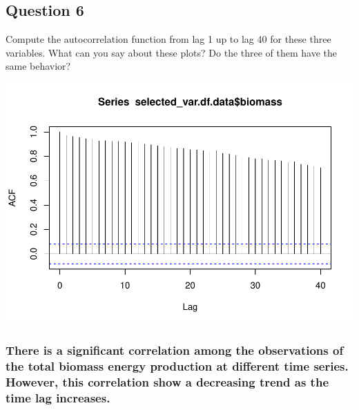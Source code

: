 \documentclass[
]{article}
\newenvironment{Shaded}{\begin{snugshade}}{\end{snugshade}}
\newcommand{\AttributeTok}[1]{\textcolor[rgb]{0.77,0.63,0.00}{#1}}
\newcommand{\ConstantTok}[1]{\textcolor[rgb]{0.00,0.00,0.00}{#1}}
\newcommand{\DecValTok}[1]{\textcolor[rgb]{0.00,0.00,0.81}{#1}}
\newcommand{\FunctionTok}[1]{\textcolor[rgb]{0.00,0.00,0.00}{#1}}
\newcommand{\NormalTok}[1]{#1}
\newcommand{\OtherTok}[1]{\textcolor[rgb]{0.56,0.35,0.01}{#1}}
\newcommand{\SpecialCharTok}[1]{\textcolor[rgb]{0.00,0.00,0.00}{#1}}
\begin{document}
\hypertarget{question-6}{%
\subsection{Question 6}\label{question-6}}

Compute the autocorrelation function from lag 1 up to lag 40 for these
three variables. What can you say about these plots? Do the three of
them have the same behavior?

\begin{Shaded}
\end{Shaded}

\includegraphics{YaredAsfaw_TSA_A02_Sp22_files/figure-latex/unnamed-chunk-18-1.pdf}

\hypertarget{there-is-a-significant-correlation-among-the-observations-of-the-total-biomass-energy-production-at-different-time-series.-however-this-correlation-show-a-decreasing-trend-as-the-time-lag-increases.}{%
\subsubsection{There is a significant correlation among the observations
of the total biomass energy production at different time series.
However, this correlation show a decreasing trend as the time lag
increases.}\label{there-is-a-significant-correlation-among-the-observations-of-the-total-biomass-energy-production-at-different-time-series.-however-this-correlation-show-a-decreasing-trend-as-the-time-lag-increases.}}
\end{document}
